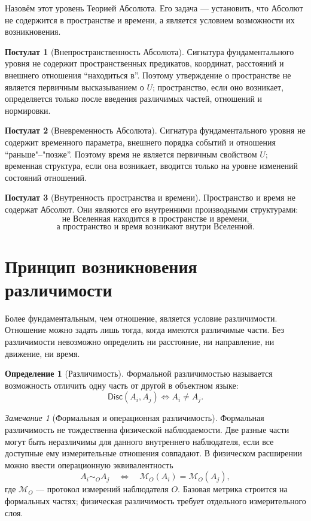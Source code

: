 \documentclass[12pt,a4paper,oneside]{book}
\theoremstyle{definition}
\newtheorem{definition}{Определение}[chapter]
\newtheorem{postulate}{Постулат}[chapter]
\theoremstyle{plain}
\theoremstyle{remark}
\newtheorem{remark}{Замечание}[chapter]
\newcommand{\Whole}{U}
\newcommand{\Disc}{\mathsf{Disc}}
\begin{document}
Назовём этот уровень Теорией Абсолюта. Его задача --- установить, что Абсолют не
содержится в пространстве и времени, а является условием возможности их возникновения.

\begin{postulate}[Внепространственность Абсолюта]
Сигнатура фундаментального уровня не содержит пространственных предикатов,
координат, расстояний и внешнего отношения ``находиться в''. Поэтому утверждение о
пространстве не является первичным высказыванием о $\Whole$; пространство, если оно
возникает, определяется только после введения различимых частей, отношений и
нормировки.
\end{postulate}

\begin{postulate}[Вневременность Абсолюта]
Сигнатура фундаментального уровня не содержит временного параметра, внешнего порядка
событий и отношения ``раньше"--"позже''. Поэтому время не является первичным
свойством $\Whole$; временная структура, если она возникает, вводится только на
уровне изменений состояний отношений.
\end{postulate}

\begin{postulate}[Внутренность пространства и времени]
Пространство и время не содержат Абсолют. Они являются его внутренними производными
структурами:
\[
\boxed{\text{не Вселенная находится в пространстве и времени,}}
\]
\[
\boxed{\text{а пространство и время возникают внутри Вселенной.}}
\]
\end{postulate}

\section{Принцип возникновения различимости}

Более фундаментальным, чем отношение, является условие различимости. Отношение можно
задать лишь тогда, когда имеются различимые части. Без различимости невозможно
определить ни расстояние, ни направление, ни движение, ни время.

\begin{definition}[Различимость]
Формальной различимостью называется возможность отличить одну часть от другой в
объектном языке:
\[
\Disc(A_i,A_j)\iff A_i\neq A_j.
\]
\end{definition}

\begin{remark}[Формальная и операционная различимость]
Формальная различимость не тождественна физической наблюдаемости. Две разные части
могут быть неразличимы для данного внутреннего наблюдателя, если все доступные ему
измерительные отношения совпадают. В физическом расширении можно ввести
операционную эквивалентность
\[
A_i\sim_O A_j
\quad\Longleftrightarrow\quad
\mathcal M_O(A_i)=\mathcal M_O(A_j),
\]
где $\mathcal M_O$ --- протокол измерений наблюдателя $O$. Базовая метрика строится
на формальных частях; физическая различимость требует отдельного измерительного
слоя.
\end{remark}
\end{document}
